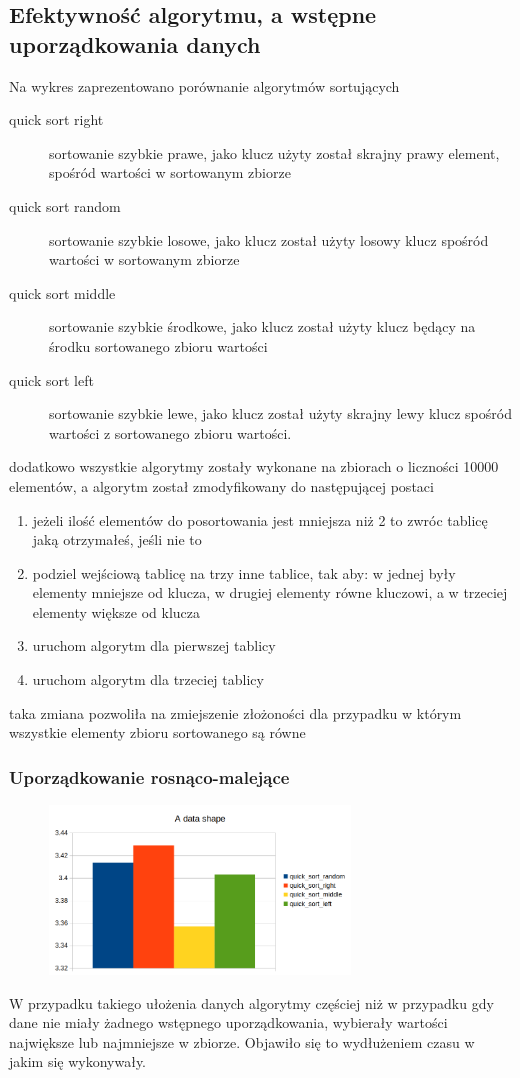 \documentclass[]{article}
\begin{document}
	\subsection{Efektywność algorytmu, a wstępne uporządkowania danych}
		Na wykres zaprezentowano porównanie algorytmów sortujących
		\begin{description}
			\item[quick sort right] sortowanie szybkie prawe, jako klucz użyty został skrajny prawy element, spośród wartości w sortowanym zbiorze
			
			\item[quick sort random] sortowanie szybkie losowe, jako klucz został użyty losowy klucz spośród wartości w sortowanym zbiorze
			
			\item[quick sort middle] sortowanie szybkie środkowe, jako klucz został użyty klucz będący na środku sortowanego zbioru wartości
			
			\item[quick sort left] sortowanie szybkie lewe, jako klucz został użyty skrajny lewy klucz spośród wartości z sortowanego zbioru wartości.
		\end{description}
		dodatkowo wszystkie algorytmy zostały wykonane na zbiorach o liczności 10000 elementów, a algorytm został zmodyfikowany do następującej postaci
		\begin{enumerate}
			\item jeżeli ilość elementów do posortowania jest mniejsza niż 2 to zwróc tablicę jaką otrzymałeś, jeśli nie to
			\item podziel wejściową tablicę na trzy inne tablice, tak aby: w jednej były elementy mniejsze od klucza, w drugiej elementy równe kluczowi, a w trzeciej elementy większe od klucza
			\item uruchom algorytm dla pierwszej tablicy
			\item uruchom algorytm dla trzeciej tablicy
		\end{enumerate}
		taka zmiana pozwoliła na zmiejszenie złożoności dla przypadku w którym wszystkie elementy zbioru sortowanego są równe
		\subsubsection{Uporządkowanie rosnąco-malejące}
		\begin{figure}[H]
			\centering
			\includegraphics[width=8cm]{quick_sort_a.png}	
		\end{figure}
		W przypadku takiego ułożenia danych algorytmy częściej niż w przypadku gdy dane nie miały żadnego wstępnego uporządkowania, wybierały wartości największe lub najmniejsze w zbiorze. Objawiło się to wydłużeniem czasu w jakim się wykonywały.
\end{document}
